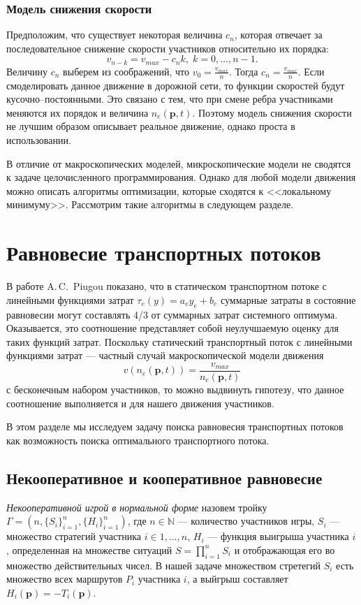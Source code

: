 \documentclass[12pt, a4paper]{article}
\begin{document}
\subsubsection*{Модель снижения скорости}

Предположим, что существует некоторая величина $c_n$, которая отвечает за последовательное снижение скорости участников относительно их порядка:
$$v_{n - k} = v_{max} - c_n k, \; k = 0, \dots, n - 1.$$
Величину $c_n$ выберем из соображений, что $v_0 = \frac{v_{max}}{n}$. Тогда $c_n = \frac{v_{max}}{n}$. Если смоделировать данное движение в дорожной сети, то функции скоростей будут кусочно--постоянными. Это связано с тем, что при смене ребра участниками меняются их порядок и величина $n_e(\textbf{p}, t)$. Поэтому модель снижения скорости не лучшим образом описывает реальное движение, однако проста в использовании.

В отличие от макроскопических моделей, микроскопические модели не сводятся к задаче целочисленного программирования. Однако для любой модели движения можно описать алгоритмы оптимизации, которые сходятся к <<локальному минимуму>>. Рассмотрим такие алгоритмы в следующем разделе.

\newpage
\section{Равновесие транспортных потоков}
\label{sec:rovn}
В работе A.\,C.~Piugou \cite{piugou} показано, что в статическом транспортном потоке с линейными функциями затрат $\tau_e(y) = a_e y_e + b_e$ суммарные затраты в состояние равновесии могут составлять 4/3 от суммарных затрат системного оптимума. Оказывается, это соотношение представляет собой неулучшаемую оценку для таких функций затрат. Поскольку статический транспортный поток с линейными функциями затрат --- частный случай макроскопической модели движения 
$$v (n_e (\textbf{p}, t)) = \frac{v_{max}}{n_e (\textbf{p}, t)}$$
с бесконечным набором участников, то можно выдвинуть гипотезу, что данное соотношение выполняется и для нашего движения участников.

В этом разделе мы исследуем задачу поиска равновесия транспортных потоков как возможность поиска оптимального транспортного потока.

\subsection{Некооперативное и кооперативное равновесие}

\textit{Некооперативной игрой в нормальной форме} назовем тройку $\Gamma = (n, \{S_i\}_{i = 1}^n, \{H_i\}_{i = 1}^n)$, где $n \in \mathbb{N}$ --- количество участников игры, $S_i$ --- множество стратегий участника $i \in {1, \dots, n}$, $H_i$ --- функция выигрыша участника $i$, определенная на множестве ситуаций $S = \prod\limits_{i = 1}^n S_i$ и отображающая его во множество действительных чисел. В нашей задаче множеством стретегий $S_i$ есть множество всех маршрутов $P_i$ участника $i$, а выйгрыш составляет $H_i(\textbf{p}) = -T_i(\textbf{p})$.
\end{document}

